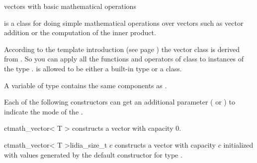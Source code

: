 


\NAME

 \dotfill vectors with basic mathematical operations



\ABSTRACT

 is a class for doing simple mathematical operations over vectors such as
vector addition or the computation of the inner product.

According to the template introduction (see page \pageref{template_introduction}) the vector
class  is derived from .  So you can apply all the
functions and operators of class  to instances of the type
.   is allowed to be either a built-in type or a class.



\DESCRIPTION

A variable of type  contains the same components as .



\CONS

Each of the following constructors can get an additional parameter ( or
) to indicate the mode of the .

\begin{fcode}{ct}{math_vector< T >}{}
  constructs a vector with capacity 0.
\end{fcode}

\begin{fcode}{ct}{math_vector< T >}{lidia_size_t $c$}
  constructs a vector with capacity $c$ initialized with values generated by the default
  constructor for type .
\end{fcode}

